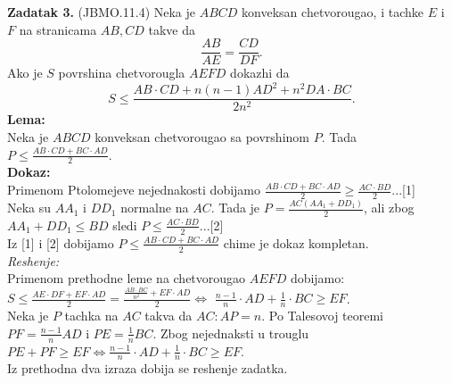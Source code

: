 \documentclass[11pt,letter]{report}
\newcommand{\D}{\displaystyle}
\begin{document}
\newpage
\begin{flushleft}
\textbf{Zadatak 3.} (JBMO.11.4) Neka je $ABCD$ konveksan chetvorougao, i tachke $E$ i $F$ na stranicama $AB,CD$ takve da $$\D\frac{AB}{AE}=\frac{CD}{DF}.$$ Ako je $S$ povrshina chetvorougla $AEFD$ dokazhi da 
$${\D S\leq\frac{AB\cdot CD+n(n-1)AD^2+n^2DA\cdot BC}{2n^2}}.$$
\textbf{Lema:}\\
Neka je $ABCD$ konveksan chetvorougao sa povrshinom $P$. Tada $\D P\leq\frac{AB\cdot CD + BC\cdot AD}{2}.$\\
\vspace{0.5cm}
\textbf{Dokaz:}\\
Primenom Ptolomejeve nejednakosti dobijamo $\D \frac{AB\cdot CD + BC\cdot AD}{2}\geq \frac{AC\cdot BD}{2}$...[1]\\
Neka su $AA_1$ i $DD_1$ normalne na $AC$. Tada je $\D P=\frac{AC(AA_1+DD_1)}{2}$, ali zbog $AA_1+DD_1\leq BD$ sledi $\D P\leq \frac{AC\cdot BD}{2}$...[2]\\
\vspace{0.2cm}
Iz [1] i [2] dobijamo $\D P\leq \frac{AB\cdot CD + BC\cdot AD}{2}$ chime je dokaz kompletan.\\
\vspace{0.5cm}
\textit{Reshenje:}\\
\vspace{0.5cm}
Primenom prethodne leme na chetvorougao $AEFD$ dobijamo: 
$\D S\leq \frac{AE\cdot DF+EF\cdot AD}{2}=\frac{\D\frac{AB\cdot BC}{n^2}+EF\cdot AD}{2} \Longleftrightarrow$ $\D\frac{n-1}{n}\cdot AD+\frac{1}{n}\cdot BC\geq EF$.\\
\vspace{0.5cm}
Neka je $P$ tachka na $AC$ takva da $\D AC:AP=n$. Po Talesovoj teoremi $\D PF=\frac{n-1}{n}AD$ i $\D PE=\frac{1}{n} BC$. Zbog nejednaksti u trouglu $\D PE+PF\geq EF \Leftrightarrow \frac{n-1}{n}\cdot AD+\frac{1}{n}\cdot BC\geq EF$.\\
Iz prethodna dva izraza dobija se reshenje zadatka.
\end{flushleft}
\end{document}
